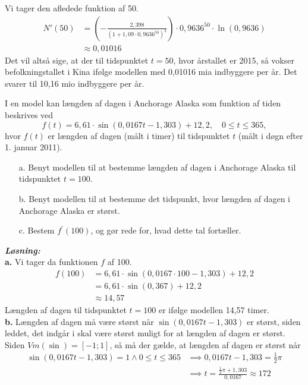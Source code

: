 \documentclass{article}
\newcommand{\sol}{\setlength{\parindent}{0cm}\textbf{\textit{Løsning:}}\setlength{\parindent}{1cm}}
\begin{document}
Vi tager den afledede funktion af 50.
\begin{equation*}
\begin{split}
  N'(50)&=\left(-\frac{2,398}{\left(1+1,09\cdot 0,9636^{50}\right)^2}\right) \cdot 0,9636^{50}\cdot \ln\left(0,9636\right) \\ 
  &\approx 0,01016
\end{split}
\end{equation*}
Det vil altså sige, at der til tidspunktet $t=50$, hvor årstallet er 2015, så vokser befolkningstallet i Kina ifølge modellen med 0,01016 mia indbyggere per år. 
Det svarer til 10,16 mio indbyggere per år.
\begin{question}{}{}
  I en model kan længden af dagen i Anchorage Alaska som funktion af tiden beskrives ved
  $$
  f(t)=6,61 \cdot \sin (0,0167 t-1,303)+12,2, \quad 0 \leq t \leq 365,
  $$
  hvor $f(t)$ er længden af dagen (målt i timer) til tidspunktet $t$ (målt i døgn efter 1. januar 2011).
  \begin{itemize}
    \item[a.] Benyt modellen til at bestemme længden af dagen i Anchorage Alaska til tidspunktet $t=100$.
    \item[b.] Benyt modellen til at bestemme det tidspunkt, hvor længden af dagen i Anchorage Alaska er størst.
    \item[c.] Bestem $f^{\prime}(100)$, og gør rede for, hvad dette tal fortæller.
  \end{itemize}
\end{question}
\sol \\ 
\textbf{a.} Vi tager da funktionen $f$ af 100.
\begin{equation*}
\begin{split}
  f(100)&= 6,61 \cdot \sin (0,0167 \cdot 100-1,303)+12,2 \\
  &=6,61\cdot \sin \left(0,367\right) +12,2\\ 
  &\approx 14,57
\end{split}
\end{equation*}
Længden af dagen til tidspunktet $t=100$ er ifølge modellen 14,57 timer. \\[1ex]
\textbf{b.} Længden af dagen må være størst når $\sin (0,0167 t-1,303)$ er størst, siden leddet, det indgår i skal være størst muligt for at længden af dagen er størst.
Siden $Vm(\sin)=[-1;1]$, så må der gælde, at længden af dagen er størst når 
\begin{equation*}
\begin{split}
  \sin (0,0167 t-1,303)=1 \land 0\leq t \leq 365 &\implies 0,0167 t -1,303 =\frac{1}{2}\pi \\
  &\implies t=\frac{\frac{1}{2}\pi+1,303}{0,0167}\approx 172
\end{split}
\end{equation*}
\end{document}
